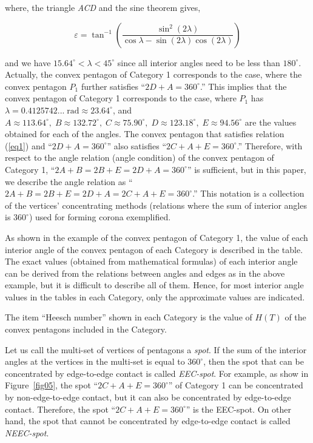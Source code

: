 \documentclass[11pt, a4paper]{article}
\begin{document}
\noindent
where, the triangle \textit{ACD} and the sine theorem gives,


\[
\varepsilon = \tan ^{ - 1}\left( {\frac{\sin ^2(2\lambda )}{\cos \lambda - 
\sin (2\lambda )\cos (2\lambda )}} \right)
\]





\noindent
and we have $15.64^ \circ < \lambda < 45^ \circ $ since all interior angles 
need to be less than $180^ \circ$. Actually, the convex pentagon of Category 1 
corresponds to the case, where the convex pentagon $P_{1}$ further satisfies 
``$2D+A = 360^ \circ$.'' This implies that the convex pentagon of Category 1 
corresponds to the case, where $P_{1}$ has $\lambda = 
0.4125742...\;\mbox{rad} \approx 23.64^ \circ $, and $A \approx 113.64^ \circ ,\;
B \approx 132.72^ \circ ,\; C \approx 75.90^ \circ ,\; D \approx 123.18^ \circ , \;
E \approx 94.56^ \circ $ are the values obtained for each of the angles. The 
convex pentagon that satisfies relation (\ref{eq1}) and ``$2D+A = 360^ \circ$'' 
also satisfies ``$2C+A+E = 360^ \circ$.'' Therefore, with respect to the angle 
relation (angle condition) of the convex pentagon of Category 1, ``$2A+B = 
2B+E = 2D+A = 360^ \circ$'' is sufficient, but in this paper, we describe the angle 
relation as ``$2A+B = 2B+E = 2D+A = 2C+A+E = 360^ \circ$.'' This notation is a 
collection of the vertices' concentrating methods (relations where the sum of interior 
angles is $360^ \circ$) used for forming corona exemplified.

As shown in the example of the convex pentagon of Category 1, the value of 
each interior angle of the convex pentagon of each Category is described in 
the table. The exact values (obtained from mathematical formulas) of each 
interior angle can be derived from the relations between angles and edges as 
in the above example, but it is difficult to describe all of them. Hence, 
for most interior angle values in the tables in each Category, only the 
approximate values are indicated.

The item ``Heesch number'' shown in each Category is the value of $H(T)$ of the 
convex pentagons included in the Category.

 Let us call the multi-set of vertices of pentagons a \textit{spot}. If the sum of the 
interior angles at the vertices in the multi-set is equal to $360^ \circ$, then 
the spot that can be concentrated by edge-to-edge contact is called 
\textit{EEC-spot}. For example, as show in Figure~\ref{fig05}, the spot ``$2C+A+E = 360^ \circ$'' 
of Category 1 can be concentrated by non-edge-to-edge contact, but it can also be 
concentrated by edge-to-edge contact. Therefore, the spot ``$2C+A+E = 360^ \circ$'' 
is the EEC-spot. On other hand, the spot that cannot be concentrated by 
edge-to-edge contact is called \textit{NEEC-spot}.
\end{document}
